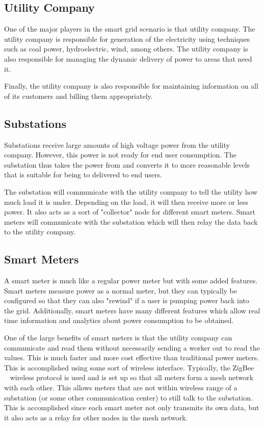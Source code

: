 \subsection{Utility Company}
One of the major players in the smart grid scenario is that utility company. The utility company is responsible for
generation of the electricity using techniques such as coal power, hydroelectric, wind, among others. The utility
company is also responsible for managing the dynamic delivery of power to areas that need it.

Finally, the utility company is also responsible for maintaining information on all of its customers and billing them
appropriately.

\subsection{Substations}
Substations receive large amounts of high voltage power from the utility company. However, this power is not ready
for end user consumption. The substation thus takes the power from and converts it to  more reasonable levels
that is suitable for being to delivered to end users.

The substation will communicate with the utility company to tell the utility how much load it is under. Depending on
the load, it will then receive more or less power. It also acts as a sort of "collector" node for different smart meters.
Smart meters will communicate with the substation which will then relay the data back to the utility company.

\subsection{Smart Meters}
A smart meter is much like a regular power meter but with some added features. Smart meters measure power as
a normal meter, but they can typically be configured so that they can also "rewind" if a user is pumping power back
into the grid. Additionally, smart meters have many different features which allow real time information and analytics
about power consumption to be obtained.

One of the large benefits of smart meters is that the utility company can communicate and read them without
necessarily sending a worker out to read the values. This is much faster and more cost effective than traditional
power meters. This is accomplished using some sort of wireless interface. Typically, the ZigBee~\cite{zigbee}
~\cite{aminetworking}
wireless protocol is used and is set up so that all meters form a mesh network with each other. This allows meters
that are not within wireless range of a substation (or some other communication center) to still talk to the substation.
This is accomplished since each smart meter not only transmits its own data, but it also acts as a relay for other nodes
in the mesh network.

